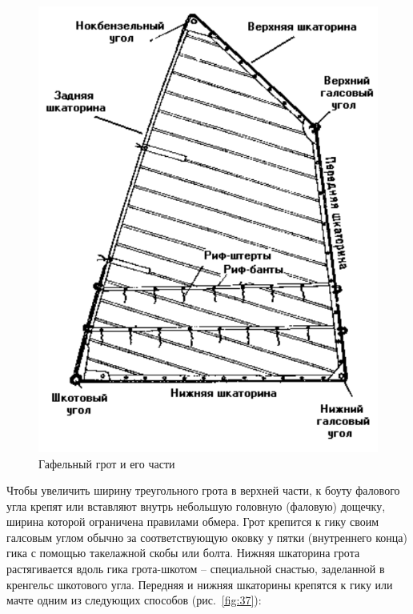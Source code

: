\documentclass[a4paper, 12pt, twoside, final]{scrbook}
\begin{document}
\begin{figure}[htbp]
\begin{centering}
\includegraphics{Gafelnyj_grot}
\par\end{centering}

\protect\caption{\label{fig:36}Гафельный
грот и его части}
\end{figure}


Чтобы увеличить ширину треугольного грота в верхней части, к боуту
фалового угла крепят или вставляют внутрь небольшую головную (фаловую)
дощечку, ширина которой ограничена правилами обмера. Грот крепится
к гику своим галсовым углом обычно за соответствующую оковку у пятки
(внутреннего конца) гика с помощью такелажной скобы или болта. Нижняя
шкаторина грота растягивается вдоль гика грота-шкотом \--- специальной
снастью, заделанной в кренгельс шкотового угла. Передняя и нижняя
шкаторины крепятся к гику или мачте одним из следующих способов (рис.~\ref{fig:37}):
\end{document}
